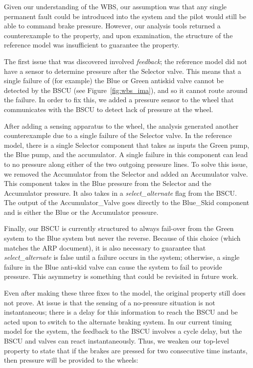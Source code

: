 Given our understanding of the WBS, our assumption was that any single permanent fault could be introduced into the system and the pilot would still be able to command brake pressure.  However, our analysis tools returned a counterexample to the property, and upon examination, the structure of the reference model was insufficient to guarantee the property.  

The first issue that was discovered involved {\em feedback}; the reference model did not have a sensor to determine pressure after the Selector valve.  This means that a single failure of (for example) the Blue or Green antiskid valve cannot be detected by the BSCU (see Figure~\ref{fig:wbs_ima}), and so it cannot route around the failure.  In order to fix this, we added a pressure sensor to the wheel that communicates with the BSCU to detect lack of pressure at the wheel.


After adding a sensing apparatus to the wheel, the analysis generated another counterexample due to a single failure of the Selector valve.  In the reference model, there is a single Selector component that takes as inputs the Green pump, the Blue pump, and the accumulator.  A single failure in this component can lead to no pressure along either of the two outgoing pressure lines.
To solve this issue, we removed the Accumulator from the Selector and added an Accumulator valve.   This component takes in the Blue pressure from the Selector and the Accumulator pressure. It also takes in a \textit{select\_alternate} flag from the BSCU. The output of the Accumulator\_Valve goes directly to the Blue\_Skid component and is either the Blue or the Accumulator pressure.

Finally, our BSCU is currently structured to always fail-over from the Green system to the Blue system but never the reverse.  Because of this choice (which matches the ARP document), it is also necessary to guarantee that \textit{select\_alternate} is false until a failure occurs in the system; otherwise, a single failure in the Blue anti-skid valve can cause the system to fail to provide pressure.  This asymmetry is something that could be revisited in future work.


Even after making these three fixes to the model, the original property still does not prove.  At issue is that the sensing of a no-pressure situation is not instantaneous; there is a delay for this information to reach the BSCU and be acted upon to switch to the alternate braking system.  In our current timing model for the system, the feedback to the BSCU involves a cycle delay, but the BSCU and valves can react instantaneously.  Thus, we weaken our top-level property to state that if the brakes are pressed for two consecutive time instants, then pressure will be provided to the wheels:

